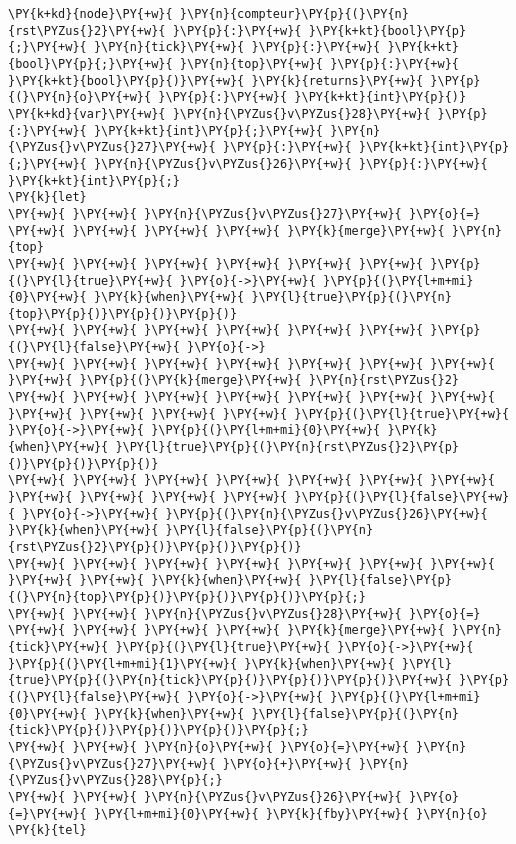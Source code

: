 \begin{Verbatim}[commandchars=\\\{\}]
\PY{k+kd}{node}\PY{+w}{ }\PY{n}{compteur}\PY{p}{(}\PY{n}{rst\PYZus{}2}\PY{+w}{ }\PY{p}{:}\PY{+w}{ }\PY{k+kt}{bool}\PY{p}{;}\PY{+w}{ }\PY{n}{tick}\PY{+w}{ }\PY{p}{:}\PY{+w}{ }\PY{k+kt}{bool}\PY{p}{;}\PY{+w}{ }\PY{n}{top}\PY{+w}{ }\PY{p}{:}\PY{+w}{ }\PY{k+kt}{bool}\PY{p}{)}\PY{+w}{ }\PY{k}{returns}\PY{+w}{ }\PY{p}{(}\PY{n}{o}\PY{+w}{ }\PY{p}{:}\PY{+w}{ }\PY{k+kt}{int}\PY{p}{)}
\PY{k+kd}{var}\PY{+w}{ }\PY{n}{\PYZus{}v\PYZus{}28}\PY{+w}{ }\PY{p}{:}\PY{+w}{ }\PY{k+kt}{int}\PY{p}{;}\PY{+w}{ }\PY{n}{\PYZus{}v\PYZus{}27}\PY{+w}{ }\PY{p}{:}\PY{+w}{ }\PY{k+kt}{int}\PY{p}{;}\PY{+w}{ }\PY{n}{\PYZus{}v\PYZus{}26}\PY{+w}{ }\PY{p}{:}\PY{+w}{ }\PY{k+kt}{int}\PY{p}{;}
\PY{k}{let}
\PY{+w}{ }\PY{+w}{ }\PY{n}{\PYZus{}v\PYZus{}27}\PY{+w}{ }\PY{o}{=}
\PY{+w}{ }\PY{+w}{ }\PY{+w}{ }\PY{+w}{ }\PY{k}{merge}\PY{+w}{ }\PY{n}{top}
\PY{+w}{ }\PY{+w}{ }\PY{+w}{ }\PY{+w}{ }\PY{+w}{ }\PY{+w}{ }\PY{p}{(}\PY{l}{true}\PY{+w}{ }\PY{o}{->}\PY{+w}{ }\PY{p}{(}\PY{l+m+mi}{0}\PY{+w}{ }\PY{k}{when}\PY{+w}{ }\PY{l}{true}\PY{p}{(}\PY{n}{top}\PY{p}{)}\PY{p}{)}\PY{p}{)}
\PY{+w}{ }\PY{+w}{ }\PY{+w}{ }\PY{+w}{ }\PY{+w}{ }\PY{+w}{ }\PY{p}{(}\PY{l}{false}\PY{+w}{ }\PY{o}{->}
\PY{+w}{ }\PY{+w}{ }\PY{+w}{ }\PY{+w}{ }\PY{+w}{ }\PY{+w}{ }\PY{+w}{ }\PY{+w}{ }\PY{p}{(}\PY{k}{merge}\PY{+w}{ }\PY{n}{rst\PYZus{}2}
\PY{+w}{ }\PY{+w}{ }\PY{+w}{ }\PY{+w}{ }\PY{+w}{ }\PY{+w}{ }\PY{+w}{ }\PY{+w}{ }\PY{+w}{ }\PY{+w}{ }\PY{+w}{ }\PY{p}{(}\PY{l}{true}\PY{+w}{ }\PY{o}{->}\PY{+w}{ }\PY{p}{(}\PY{l+m+mi}{0}\PY{+w}{ }\PY{k}{when}\PY{+w}{ }\PY{l}{true}\PY{p}{(}\PY{n}{rst\PYZus{}2}\PY{p}{)}\PY{p}{)}\PY{p}{)}
\PY{+w}{ }\PY{+w}{ }\PY{+w}{ }\PY{+w}{ }\PY{+w}{ }\PY{+w}{ }\PY{+w}{ }\PY{+w}{ }\PY{+w}{ }\PY{+w}{ }\PY{+w}{ }\PY{p}{(}\PY{l}{false}\PY{+w}{ }\PY{o}{->}\PY{+w}{ }\PY{p}{(}\PY{n}{\PYZus{}v\PYZus{}26}\PY{+w}{ }\PY{k}{when}\PY{+w}{ }\PY{l}{false}\PY{p}{(}\PY{n}{rst\PYZus{}2}\PY{p}{)}\PY{p}{)}\PY{p}{)}
\PY{+w}{ }\PY{+w}{ }\PY{+w}{ }\PY{+w}{ }\PY{+w}{ }\PY{+w}{ }\PY{+w}{ }\PY{+w}{ }\PY{+w}{ }\PY{k}{when}\PY{+w}{ }\PY{l}{false}\PY{p}{(}\PY{n}{top}\PY{p}{)}\PY{p}{)}\PY{p}{)}\PY{p}{;}
\PY{+w}{ }\PY{+w}{ }\PY{n}{\PYZus{}v\PYZus{}28}\PY{+w}{ }\PY{o}{=}
\PY{+w}{ }\PY{+w}{ }\PY{+w}{ }\PY{+w}{ }\PY{k}{merge}\PY{+w}{ }\PY{n}{tick}\PY{+w}{ }\PY{p}{(}\PY{l}{true}\PY{+w}{ }\PY{o}{->}\PY{+w}{ }\PY{p}{(}\PY{l+m+mi}{1}\PY{+w}{ }\PY{k}{when}\PY{+w}{ }\PY{l}{true}\PY{p}{(}\PY{n}{tick}\PY{p}{)}\PY{p}{)}\PY{p}{)}\PY{+w}{ }\PY{p}{(}\PY{l}{false}\PY{+w}{ }\PY{o}{->}\PY{+w}{ }\PY{p}{(}\PY{l+m+mi}{0}\PY{+w}{ }\PY{k}{when}\PY{+w}{ }\PY{l}{false}\PY{p}{(}\PY{n}{tick}\PY{p}{)}\PY{p}{)}\PY{p}{)}\PY{p}{;}
\PY{+w}{ }\PY{+w}{ }\PY{n}{o}\PY{+w}{ }\PY{o}{=}\PY{+w}{ }\PY{n}{\PYZus{}v\PYZus{}27}\PY{+w}{ }\PY{o}{+}\PY{+w}{ }\PY{n}{\PYZus{}v\PYZus{}28}\PY{p}{;}
\PY{+w}{ }\PY{+w}{ }\PY{n}{\PYZus{}v\PYZus{}26}\PY{+w}{ }\PY{o}{=}\PY{+w}{ }\PY{l+m+mi}{0}\PY{+w}{ }\PY{k}{fby}\PY{+w}{ }\PY{n}{o}
\PY{k}{tel}
\end{Verbatim}
